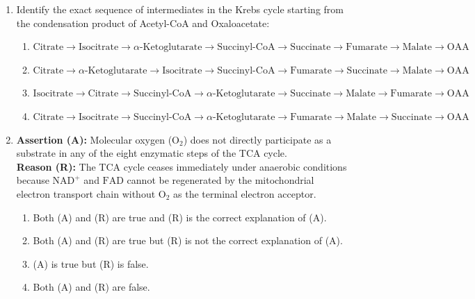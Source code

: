 \documentclass[11pt, a4paper]{article}
\begin{document}
\begin{enumerate}[label=\textbf{\arabic*.}]
\item Identify the exact sequence of intermediates in the Krebs cycle starting from the condensation product of Acetyl-CoA and Oxaloacetate:
\begin{enumerate}[label=(\Alph*)]
    \item $\text{Citrate} \rightarrow \text{Isocitrate} \rightarrow \alpha\text{-Ketoglutarate} \rightarrow \text{Succinyl-CoA} \rightarrow \text{Succinate} \rightarrow \text{Fumarate} \rightarrow \text{Malate} \rightarrow \text{OAA}$
    \item $\text{Citrate} \rightarrow \alpha\text{-Ketoglutarate} \rightarrow \text{Isocitrate} \rightarrow \text{Succinyl-CoA} \rightarrow \text{Fumarate} \rightarrow \text{Succinate} \rightarrow \text{Malate} \rightarrow \text{OAA}$
    \item $\text{Isocitrate} \rightarrow \text{Citrate} \rightarrow \text{Succinyl-CoA} \rightarrow \alpha\text{-Ketoglutarate} \rightarrow \text{Succinate} \rightarrow \text{Malate} \rightarrow \text{Fumarate} \rightarrow \text{OAA}$
    \item $\text{Citrate} \rightarrow \text{Isocitrate} \rightarrow \text{Succinyl-CoA} \rightarrow \alpha\text{-Ketoglutarate} \rightarrow \text{Fumarate} \rightarrow \text{Malate} \rightarrow \text{Succinate} \rightarrow \text{OAA}$
\end{enumerate}

\item \textbf{Assertion (A):} Molecular oxygen ($\text{O}_2$) does not directly participate as a substrate in any of the eight enzymatic steps of the TCA cycle. \\
\textbf{Reason (R):} The TCA cycle ceases immediately under anaerobic conditions because $\text{NAD}^+$ and $\text{FAD}$ cannot be regenerated by the mitochondrial electron transport chain without $\text{O}_2$ as the terminal electron acceptor.
\begin{enumerate}[label=(\Alph*)]
    \item Both (A) and (R) are true and (R) is the correct explanation of (A).
    \item Both (A) and (R) are true but (R) is not the correct explanation of (A).
    \item (A) is true but (R) is false.
    \item Both (A) and (R) are false.
\end{enumerate}


\end{enumerate}
\end{document}
